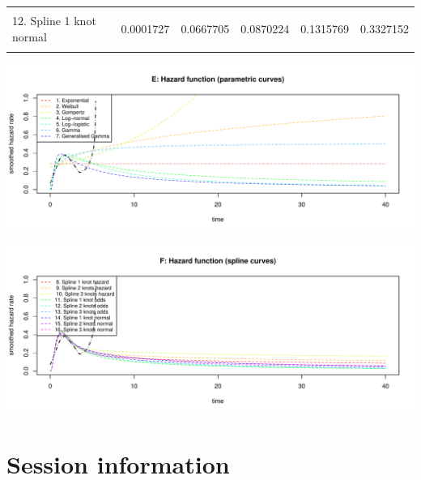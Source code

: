 \documentclass[]{article}
\begin{document}
\begin{tabular}{lrrrrr}
\cellcolor{gray!6}{11. Spline 2 knots odds} & \cellcolor{gray!6}{0.0029239} & \cellcolor{gray!6}{0.0397013} & \cellcolor{gray!6}{0.0573770} & \cellcolor{gray!6}{0.1025038} & \cellcolor{gray!6}{0.3469030}\\
12. Spline 1 knot normal & 0.0001727 & 0.0667705 & 0.0870224 & 0.1315769 & 0.3327152\\
\cellcolor{gray!6}{13. Spline 2 knots normal} & \cellcolor{gray!6}{0.0003302} & \cellcolor{gray!6}{0.0575542} & \cellcolor{gray!6}{0.0758377} & \cellcolor{gray!6}{0.1164719} & \cellcolor{gray!6}{0.3361441}\\
\bottomrule
\end{tabular}

\begin{flushleft}\includegraphics[height=0.29\textheight]{Images/validate_extrapolation3-5} \end{flushleft}

\begin{flushleft}\includegraphics[height=0.29\textheight]{Images/validate_extrapolation3-6} \end{flushleft}

\newpage

\section{Session information}\label{session-information}
\end{document}
